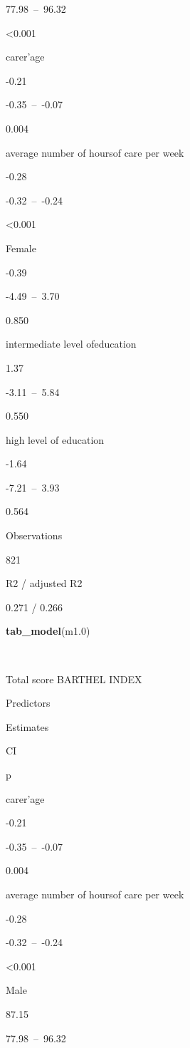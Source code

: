 \documentclass[]{article}
\newenvironment{Shaded}{\begin{snugshade}}{\end{snugshade}}
\newcommand{\KeywordTok}[1]{\textcolor[rgb]{0.13,0.29,0.53}{\textbf{#1}}}
\newcommand{\DecValTok}[1]{\textcolor[rgb]{0.00,0.00,0.81}{#1}}
\newcommand{\NormalTok}[1]{#1}
\begin{document}
77.98~--~96.32

\textless{}0.001

carer'age

-0.21

-0.35~--~-0.07

0.004

average number of hoursof care per week

-0.28

-0.32~--~-0.24

\textless{}0.001

Female

-0.39

-4.49~--~3.70

0.850

intermediate level ofeducation

1.37

-3.11~--~5.84

0.550

high level of education

-1.64

-7.21~--~3.93

0.564

Observations

821

R2 / adjusted R2

0.271 / 0.266

\begin{Shaded}
\begin{Highlighting}[]
\KeywordTok{tab_model}\NormalTok{(m1.}\DecValTok{0}\NormalTok{)}
\end{Highlighting}
\end{Shaded}

~

Total score BARTHEL INDEX

Predictors

Estimates

CI

p

carer'age

-0.21

-0.35~--~-0.07

0.004

average number of hoursof care per week

-0.28

-0.32~--~-0.24

\textless{}0.001

Male

87.15

77.98~--~96.32
\end{document}
